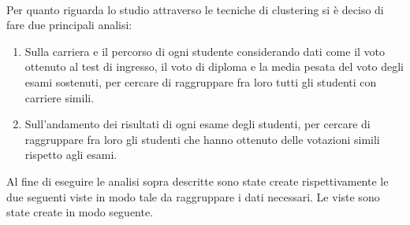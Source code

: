 \documentclass[]{article}
\begin{document}
\paragraph{}
Per quanto riguarda lo studio attraverso le tecniche di clustering si \`{e} deciso di fare due principali analisi:
\begin{enumerate}
	\item Sulla carriera e il percorso di ogni studente considerando dati come il voto ottenuto al test di ingresso, il voto di diploma e la media pesata del voto degli esami sostenuti, per cercare di raggruppare fra loro tutti gli studenti con carriere simili.
	
	\item Sull'andamento dei risultati di ogni esame degli studenti, per cercare di raggruppare fra loro gli studenti che hanno ottenuto delle votazioni simili rispetto agli esami.
\end{enumerate}
Al fine di eseguire le analisi sopra descritte sono state create rispettivamente le due seguenti viste in modo tale da raggruppare i dati necessari. Le viste sono state create in modo seguente.
\end{document}
